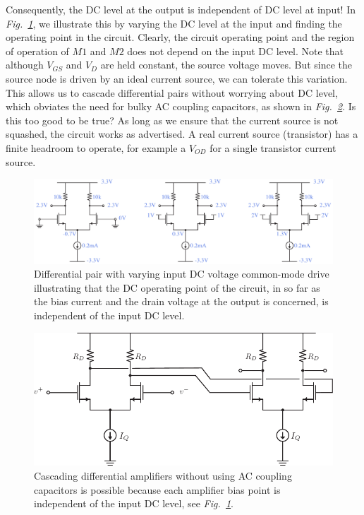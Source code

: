 Consequently, the DC level at the output is independent of DC level at input! In \emph{Fig.~\ref{fig:diff_amp_bias_cm}}, we illustrate this by varying the DC level at the input and finding the operating point in the circuit.  Clearly, the circuit operating point and the region of operation of $M1$ and $M2$ does not depend on the input DC level.  Note that although $V_{GS}$ and $V_{D}$ are held constant, the source voltage moves.  But since the source node is driven by an ideal current source, we can tolerate this variation.  This allows us to cascade differential pairs without worrying about DC level, which obviates the need for bulky AC coupling capacitors, as shown in \emph{Fig.~\ref{fig:diff_amp_cascade}}.  Is this too good to be true?  As long as we ensure that the current source is not squashed, the circuit works as advertised.  A real current source (transistor) has a finite headroom to operate, for example a $V_{OD}$ for a single transistor current source.
\begin{figure}[H]
\centering
\includegraphics[width=\columnwidth]{diff_amp_bias_cm}
\caption{Differential pair with varying input DC voltage common-mode drive illustrating that the DC operating point of the circuit, in so far as the bias current and the drain voltage at the output is concerned, is independent of the input DC level.}
\label{fig:diff_amp_bias_cm}
\end{figure}
\newpage
\begin{figure}[t]
\centering
\includegraphics[scale=1.05]{Diff_Cascade}
\caption{Cascading differential amplifiers without using AC coupling capacitors is possible because each amplifier bias point is independent of the input DC level, see \emph{Fig.~\ref{fig:diff_amp_bias_cm}}.}
\label{fig:diff_amp_cascade}
\end{figure}
